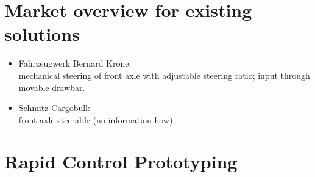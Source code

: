 \documentclass[ExampleMasters.tex]{subfiles}
\begin{document}
\section{Market overview for existing solutions}
\label{sec:market_overview}
\begin{itemize}
	\item Fahrzeugwerk Bernard Krone: \\
	mechanical steering of front axle with adjustable steering ratio; input through movable drawbar.
	\item Schmitz Cargobull: \\
	front axle steerable (no information how)
	
\end{itemize}
\section{Rapid Control Prototyping}
\label{sec:rapid_proto}
\end{document}
